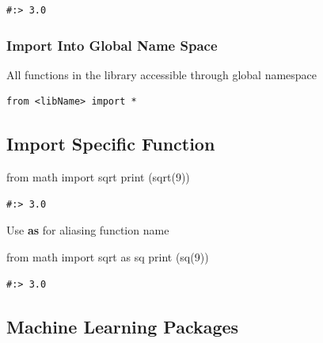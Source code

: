 \documentclass[
]{book}
\newenvironment{Shaded}{\begin{snugshade}}{\end{snugshade}}
\newcommand{\BuiltInTok}[1]{#1}
\newcommand{\DecValTok}[1]{\textcolor[rgb]{0.06,0.06,0.06}{#1}}
\newcommand{\ImportTok}[1]{#1}
\newcommand{\NormalTok}[1]{#1}
\begin{document}
\begin{verbatim}
#:> 3.0
\end{verbatim}

\hypertarget{import-into-global-name-space}{%
\subsubsection{Import Into Global Name Space}\label{import-into-global-name-space}}

All functions in the library accessible through global namespace

\begin{verbatim}
from <libName> import *
\end{verbatim}

\hypertarget{import-specific-function}{%
\subsection{Import Specific Function}\label{import-specific-function}}

\begin{Shaded}
\begin{Highlighting}[]
\ImportTok{from}\NormalTok{ math }\ImportTok{import}\NormalTok{ sqrt}
\BuiltInTok{print}\NormalTok{ (sqrt(}\DecValTok{9}\NormalTok{))}
\end{Highlighting}
\end{Shaded}

\begin{verbatim}
#:> 3.0
\end{verbatim}

Use \textbf{as} for aliasing function name

\begin{Shaded}
\begin{Highlighting}[]
\ImportTok{from}\NormalTok{ math }\ImportTok{import}\NormalTok{ sqrt }\ImportTok{as}\NormalTok{ sq}
\BuiltInTok{print}\NormalTok{ (sq(}\DecValTok{9}\NormalTok{))}
\end{Highlighting}
\end{Shaded}

\begin{verbatim}
#:> 3.0
\end{verbatim}

\hypertarget{machine-learning-packages}{%
\subsection{Machine Learning Packages}\label{machine-learning-packages}}
\end{document}
